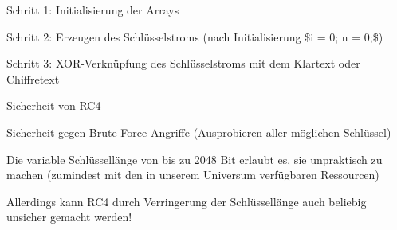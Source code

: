\documentclass[a4paper]{article}
\begin{document}
\begin{multicols}{3}
\begin{itemize*}
\begin{itemize*}
                  \item Schritt 1: Initialisierung der Arrays
                  \item Schritt 2: Erzeugen des Schlüsselstroms (nach Initialisierung \$i = 0; n = 0;\$)
                  \item Schritt 3: XOR-Verknüpfung des Schlüsselstroms mit dem Klartext oder Chiffretext
            \end{itemize*}
            \item Sicherheit von RC4
            \begin{itemize*}
                  \item Sicherheit gegen Brute-Force-Angriffe (Ausprobieren aller möglichen Schlüssel)
                  \begin{itemize*} \item Die variable Schlüssellänge von bis zu 2048 Bit erlaubt es, sie unpraktisch zu machen (zumindest mit den in unserem Universum verfügbaren Ressourcen) \item Allerdings kann RC4 durch Verringerung der Schlüssellänge auch beliebig unsicher gemacht werden! \end{itemize*}

\end{itemize*}
\end{itemize*}
\end{multicols}
\end{document}

